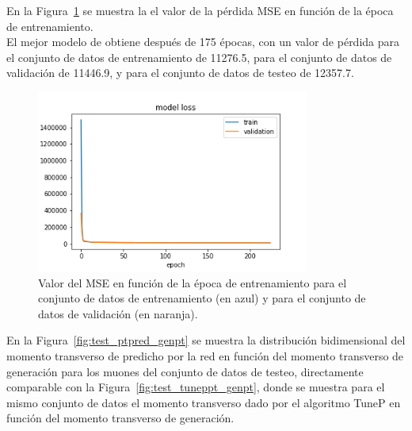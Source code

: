 En la Figura~\ref{fig:model_loss} se muestra la el valor de la p\'erdida MSE en funci\'on de la \'epoca de entrenamiento. \\

El mejor modelo de obtiene despu\'es de 175 \'epocas, con un valor de p\'erdida para el conjunto de datos de entrenamiento de 11276.5, para el conjunto de datos de validaci\'on de 11446.9, y para el conjunto de datos de testeo de 12357.7.  \\

\begin{figure}[h]
\centering
\includegraphics[width=0.8\textwidth]{figures/model_loss.png}
\caption{Valor del MSE en funci\'on de la \'epoca de entrenamiento para el conjunto de datos de entrenamiento (en azul) y para el conjunto de datos de validaci\'on (en naranja).}
\label{fig:model_loss}        
\end{figure}

En la Figura~\ref{fig:test_ptpred_genpt} se muestra la distribuci\'on bidimensional del momento transverso de predicho por la red en funci\'on del momento transverso de generaci\'on para los muones del conjunto de datos de testeo, directamente comparable con la Figura~\ref{fig:test_tuneppt_genpt}, donde se muestra para el mismo conjunto de datos el momento transverso dado por el algoritmo TuneP en funci\'on del momento transverso de generaci\'on. \\

